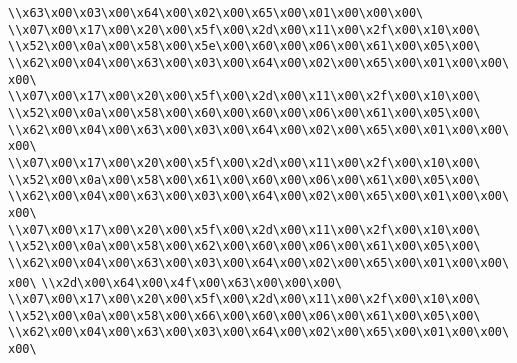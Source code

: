 \verb|\\x63\x00\x03\x00\x64\x00\x02\x00\x65\x00\x01\x00\x00\x00\|\newline
\verb|\\x07\x00\x17\x00\x20\x00\x5f\x00\x2d\x00\x11\x00\x2f\x00\x10\x00\|\newline
\verb|\\x52\x00\x0a\x00\x58\x00\x5e\x00\x60\x00\x06\x00\x61\x00\x05\x00\|\newline
\verb|\\x62\x00\x04\x00\x63\x00\x03\x00\x64\x00\x02\x00\x65\x00\x01\x00\x00\x00\|\newline
\verb|\\x07\x00\x17\x00\x20\x00\x5f\x00\x2d\x00\x11\x00\x2f\x00\x10\x00\|\newline
\verb|\\x52\x00\x0a\x00\x58\x00\x60\x00\x60\x00\x06\x00\x61\x00\x05\x00\|\newline
\verb|\\x62\x00\x04\x00\x63\x00\x03\x00\x64\x00\x02\x00\x65\x00\x01\x00\x00\x00\|\newline
\verb|\\x07\x00\x17\x00\x20\x00\x5f\x00\x2d\x00\x11\x00\x2f\x00\x10\x00\|\newline
\verb|\\x52\x00\x0a\x00\x58\x00\x61\x00\x60\x00\x06\x00\x61\x00\x05\x00\|\newline
\verb|\\x62\x00\x04\x00\x63\x00\x03\x00\x64\x00\x02\x00\x65\x00\x01\x00\x00\x00\|\newline
\verb|\\x07\x00\x17\x00\x20\x00\x5f\x00\x2d\x00\x11\x00\x2f\x00\x10\x00\|\newline
\verb|\\x52\x00\x0a\x00\x58\x00\x62\x00\x60\x00\x06\x00\x61\x00\x05\x00\|\newline
\verb|\\x62\x00\x04\x00\x63\x00\x03\x00\x64\x00\x02\x00\x65\x00\x01\x00\x00\x00\|\newline
\verb|\\x2d\x00\x64\x00\x4f\x00\x63\x00\x00\x00\|\newline
\verb|\\x07\x00\x17\x00\x20\x00\x5f\x00\x2d\x00\x11\x00\x2f\x00\x10\x00\|\newline
\verb|\\x52\x00\x0a\x00\x58\x00\x66\x00\x60\x00\x06\x00\x61\x00\x05\x00\|\newline
\verb|\\x62\x00\x04\x00\x63\x00\x03\x00\x64\x00\x02\x00\x65\x00\x01\x00\x00\x00\|\newline
